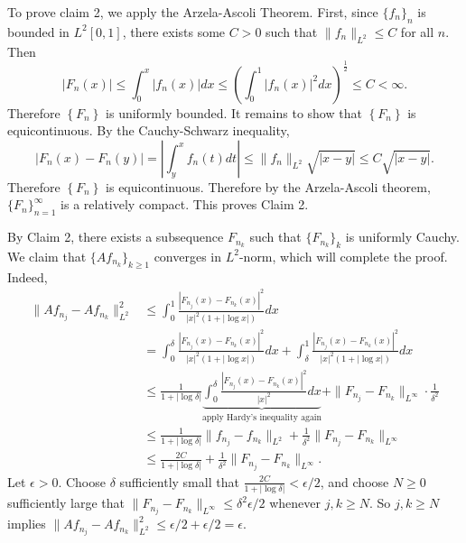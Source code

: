 \documentclass[answers]{exam}
\def\({\left (}
\def\){\right )}
\begin{document}
\begin{questions}
\begin{solution}
  To prove claim 2, we apply the Arzela-Ascoli Theorem. First, since $\{f_{n}\}_{n}$ is bounded in $L^{2}[0,1]$, there exists some $C>0$ such that $\| f_{n} \|_{L^{2}}\leq C$ for all $n$. Then
  \begin{equation*}
    |F_{n}(x)| \leq \int_{0}^{x}|f_{n}(x)|dx \leq \(\int_{0}^{1}|f_{n}(x)|^{2}dx \)^{\frac{1}{2}} \leq C <\infty.
  \end{equation*}
  Therefore $\left\{ F_{n} \right\}$ is uniformly bounded. It remains to show that $\left\{ F_{n} \right\}$ is equicontinuous. By the Cauchy-Schwarz inequality,
  \begin{equation*}
    \left| F_{n}(x)-F_{n}(y) \right| = \left| \int_{y}^{x}f_{n}(t)dt \right| \leq \| f_{n} \|_{L^{2}} \sqrt{|x-y|} \leq C \sqrt{|x-y|}.
  \end{equation*}
  Therefore  $\left\{ F_{n} \right\}$ is equicontinuous. Therefore by the Arzela-Ascoli theorem, $\{F_{n}\}_{n=1}^{\infty}$ is a relatively compact. This proves Claim 2.

  By Claim 2, there exists a subsequence $F_{n_{k}}$ such that $\{F_{n_{k}}\}_{k}$ is uniformly Cauchy. We claim that $\{Af_{n_{k}}\}_{k\geq 1}$ converges in $L^{2}$-norm, which will complete the proof. Indeed,
  \begin{align*}
    \| Af_{n_{j}}-Af_{n_{k}} \|_{L^{2}}^{2}
    &\leq \int_{0}^{1}\frac{|F_{n_{j}}(x)-F_{n_{k}}(x)|^{2}}{|x|^{2}\left( 1+|\log x| \right)} dx\\
    &= \int_{0}^{\delta}\frac{|F_{n_{j}}(x)-F_{n_{k}}(x)|^{2}}{|x|^{2}\left( 1+|\log x| \right)} dx + \int_{\delta}^{1}\frac{|F_{n_{j}}(x)-F_{n_{k}}(x)|^{2}}{|x|^{2}\left( 1+|\log x| \right)} dx\\
    &\leq \frac{1}{1+|\log \delta |} \underbrace{\int_{0}^{\delta}\frac{|F_{n_{j}}(x)-F_{n_{k}}(x)|^{2}}{|x|^{2}} dx}_{\text{apply Hardy's inequality again}} + \| F_{n_{j}}-F_{n_{k}} \|_{L^{\infty}} \cdot\frac{1}{\delta^{2}}\\
    &\leq \frac{1}{1+|\log \delta |} \| f_{n_{j}}-f_{n_{k}} \|_{L^{2}} + \frac{1}{\delta^{2}} \| F_{n_{j}}-F_{n_{k}}\|_{L^{\infty}}\\
    &\leq \frac{2C}{1+|\log \delta|} + \frac{1}{\delta^{2}} \| F_{n_{j}}-F_{n_{k}} \|_{L^{\infty}}.
  \end{align*}
  Let $\epsilon>0$. Choose $\delta$ sufficiently small that $\frac{2C}{1+|\log \delta|}<\epsilon/2$, and choose $N\geq 0$ sufficiently large that $\| F_{n_{j}}-F_{n_{k}} \|_{L^{\infty}}\leq \delta^{2}\epsilon/2$ whenever $j,k\geq N$. So $j,k\geq N$ implies $\| Af_{n_{j}}-Af_{n_{k}} \|_{L^{2}}^{2} \leq \epsilon/2 + \epsilon/2= \epsilon$.
  

\end{solution}
\end{questions}
\end{document}
